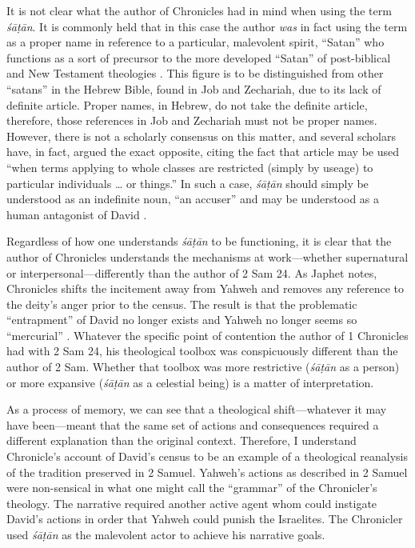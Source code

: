It is not clear what the author of Chronicles had in mind when using the
term \emph{śāṭān}. It is commonly held that in this case the author
\emph{was} in fact using the term as a proper name in reference to a
particular, malevolent spirit, ``Satan'' who functions as a sort of
precursor to the more developed ``Satan'' of post-biblical and New
Testament theologies \autocite[4--5]{rollston_keith-stuckenbruck2016}.
This figure is to be distinguished from other ``satans'' in the Hebrew
Bible, found in Job and Zechariah, due to its lack of definite article.
Proper names, in Hebrew, do not take the definite article, therefore,
those references in Job and Zechariah must not be proper names. However,
there is not a scholarly consensus on this matter, and several scholars
have, in fact, argued the exact opposite, citing the fact that article
may be used ``when terms applying to whole classes are restricted
(simply by useage) to particular individuals \ldots{} or things.''
\autocites[§126d]{geseniuskautzsch1910}[as argued by][115]{japhet2009}
In such a case, \emph{śāṭān} should simply be understood as an
indefinite noun, ``an accuser'' and may be understood as a human
antagonist of David
\autocites{stokes_jbl2009}[114--117]{japhet2009}[370--390]{japhet1993}.

Regardless of how one understands \emph{śāṭān} to be functioning, it is
clear that the author of Chronicles understands the mechanisms at
work---whether supernatural or interpersonal---differently than the
author of 2 Sam 24. As Japhet notes, Chronicles shifts the incitement
away from Yahweh and removes any reference to the deity's anger prior to
the census. The result is that the problematic ``entrapment'' of David
no longer exists and Yahweh no longer seems so ``mercurial''
\autocite[4]{rollston_keith-stuckenbruck2016}. Whatever the specific
point of contention the author of 1 Chronicles had with 2 Sam 24, his
theological toolbox was conspicuously different than the author of 2
Sam. Whether that toolbox was more restrictive (\emph{śāṭān} as a
person) or more expansive (\emph{śāṭān} as a celestial being) is a
matter of interpretation.

As a process of memory, we can see that a theological shift---whatever
it may have been---meant that the same set of actions and consequences
required a different explanation than the original context. Therefore, I
understand Chronicle's account of David's census to be an example of a
theological reanalysis of the tradition preserved in 2 Samuel. Yahweh's
actions as described in 2 Samuel were non-sensical in what one might
call the ``grammar'' of the Chronicler's theology. The narrative
required another active agent whom could instigate David's actions in
order that Yahweh could punish the Israelites. The Chronicler used
\emph{śāṭān} as the malevolent actor to achieve his narrative goals.
